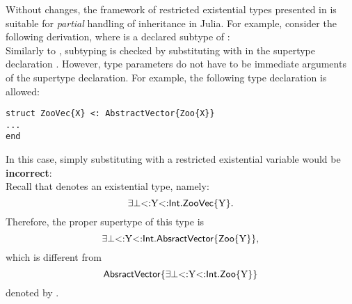 Without changes, the framework of restricted existential types presented
in  is suitable for \emph{partial} handling of
inheritance in Julia. For example, consider the following derivation,
where \tyinv\nvec\vx is a declared subtype of \tyinv\nabsvec\vx:\\
Similarly to , subtyping is checked by substituting
\vx with \rexvarbound{\tybot}{\tyint} in the supertype declaration
\tyinv\nabsvec\vx.
However, type parameters do not have to be immediate arguments of the 
supertype declaration. For example, the following type declaration is
allowed:
\begin{center}
\begin{minipage}{7cm}
\begin{lstlisting}
struct ZooVec{X} <: AbstractVector{Zoo{X}}
...
end
\end{lstlisting}  
\end{minipage}
\end{center}
In this case, simply substituting \vx with a restricted existential variable
would be \textbf{incorrect}:\\
Recall that 
denotes an existential type, namely:
\[
    \exists\bot{\operatorname{<:}}\mathrm{Y}{\operatorname{<:}}\mathsf{Int}.\mathsf{ZooVec}\{\mathrm{Y}\}.
\]
Therefore, the proper supertype of this type is
\[
    \exists\bot{\operatorname{<:}}\mathrm{Y}{\operatorname{<:}}\mathsf{Int}.\mathsf{AbsractVector}\{\mathsf{Zoo}\{\mathrm{Y}\}\},
\]
which is different from 
\[
    \mathsf{AbsractVector}\{\exists\bot{\operatorname{<:}}\mathrm{Y}{\operatorname{<:}}\mathsf{Int}.\mathsf{Zoo}\{\mathrm{Y}\}\}
\]
denoted by \tyinv{}.

